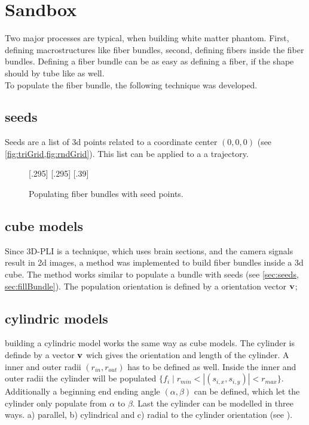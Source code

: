 \section{Sandbox}
% 
Two major processes are typical, when building white matter phantom. First, defining macrostructures like fiber bundles, second, defining fibers inside the fiber bundles.
Defining a fiber bundle can be as easy as defining a fiber, if the shape should by tube like as well.
\\
To populate the fiber bundle, the following technique was developed.
% 
\subsection{seeds}\label{sec:seeds}
% 
Seeds are a list of 3d points related to a coordinate center $(0,0,0)$ (see \cref{fig:triGrid,fig:rndGrid}).
This list can be applied to a a trajectory.
% 
% 
\begin{figure}[!t]
    \def\tikzheight{0.25\textwidth}
    \centering
    [.295\textwidth]{
    \hfill}
    [.295\textwidth]{
    }\hfill
    [.39\textwidth]{
    \hfill}
	\caption{Populating fiber bundles with seed points.}
\end{figure}
% 
\subsection{cube models}
% 
Since \ac{3D-PLI} is a technique, which uses brain sections, and the camera signals result in 2d images, a method was implemented to build fiber bundles inside a 3d cube.
The method works similar to populate a bundle with seeds (see \cref{sec:seeds, sec:fillBundle}).
The population orientation is defined by a orientation vector $\mathbf{v}$;
% 
\subsection{cylindric models}
% 
building a cylindric model works the same way as cube models.
The cylinder is definde by a vector $\mathbf{v}$ wich gives the orientation and length of the cylinder.
A inner and outer radii $(r_{\mathit{in}}, r_{\mathit{out}})$ has to be defined as well.
Inside the inner and outer radii the cylinder will be populated $\{f_i \mid r_{min} < |(s_{i,x},s_{i,y})| < r_{max} \}$.
Additionally a beginning end ending angle $(\alpha, \beta)$ can be defined, which let the cylinder only populate from $\alpha$ to $\beta$.
Last the cylinder can be modelled in three ways. a) parallel, b) cylindrical and c) radial to the cylinder orientation (see \dummy).
% 
